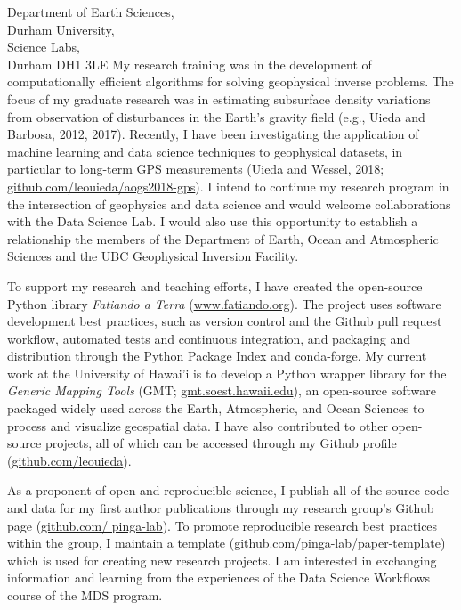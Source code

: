 \documentclass[11pt]{letter}
\begin{document}
\begin{letter}{
        Department of Earth Sciences,  \\
        Durham University, \\
        Science Labs, \\
        Durham DH1 3LE
}
My research training was in the development of computationally efficient
algorithms for solving geophysical inverse problems.
The focus of my graduate research was in estimating subsurface density
variations from observation of disturbances in the Earth's gravity field (e.g.,
Uieda and Barbosa, 2012, 2017).
Recently, I have been investigating the application of machine learning and
data science techniques to geophysical datasets,
in particular to long-term GPS measurements
(Uieda and Wessel, 2018;
\href{https://github.com/leouieda/aogs2018-gps}{github.com/leouieda/aogs2018-gps}).
I intend to continue my research program in the intersection of geophysics and
data science and would welcome collaborations with the Data Science Lab.
I would also use this opportunity to establish a relationship the members of
the Department of Earth, Ocean and Atmospheric Sciences and the
UBC Geophysical Inversion Facility.

To support my research and teaching efforts, I have created the open-source
Python library \textit{Fatiando a Terra}
(\href{http://www.fatiando.org/}{www.fatiando.org}).
The project uses software development best practices, such as version control
and the Github pull request workflow,
automated tests and continuous integration,
and packaging and distribution through the Python Package Index and
conda-forge.
My current work at the University of Hawai'i is to develop a Python wrapper
library for the \textit{Generic Mapping Tools}
(GMT; \href{http://gmt.soest.hawaii.edu/}{gmt.soest.hawaii.edu}),
an open-source software packaged widely used across the Earth, Atmospheric, and
Ocean Sciences to process and visualize geospatial data.
I have also contributed to other open-source projects, all of which can be
accessed through my Github profile
(\href{https://github.com/leouieda/}{github.com/leouieda}).

As a proponent of open and reproducible science, I publish all of the
source-code and data for my first author publications through my research
group's Github page
(\href{https://github.com/pinga-lab}{github.com/ pinga-lab}).
To promote reproducible research best practices within the group,
I maintain a template
(\href{https://github.com/pinga-lab/paper-template}{github.com/pinga-lab/paper-template})
which is used for creating new research projects.
I am interested in exchanging information and learning from the experiences of
the Data Science Workflows course of the MDS program.



\end{letter}
\end{document}

